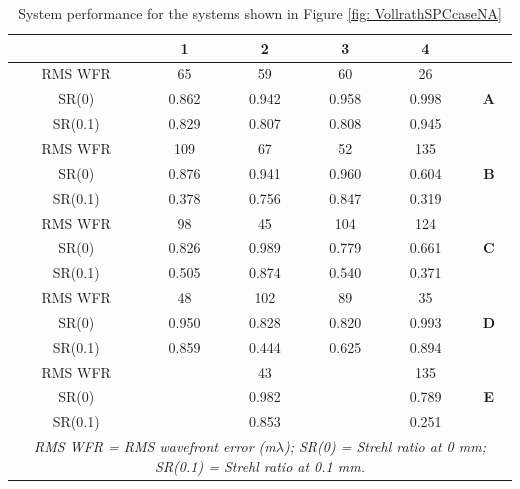 \setlength{\arrayrulewidth}{.5mm}
\setlength{\tabcolsep}{18pt}
\renewcommand{\arraystretch}{1.2}
\begin{table}[h!]
    \centering
    \captionsetup{justification=centering}
    \caption{System performance for the systems shown in Figure \ref{fig: VollrathSPCcaseNA}}
    \label{table: vollratSPCcaseNA}
    \vspace{-1em}
    \begin{adjustbox}{max width=\textwidth, center}
    \begin{tabular}{c c c c c c}
    \hline 
       & \textbf{1} & \textbf{2} & \textbf{3} & \textbf{4} & \\ 
     \midrule
    RMS WFR & 65 & 59 & 60 & 26 & \multirow{3}{*}{\textbf{A}} \\ 
    SR(0) & 0.862 & 0.942 & 0.958 & 0.998\\
    SR(0.1) & 0.829 & 0.807 & 0.808 & 0.945\\
    \midrule
    RMS WFR& 109 & 67 & 52 & 135 & \multirow{3}{*}{\textbf{B}} \\ 
    SR(0) & 0.876 & 0.941 & 0.960 & 0.604\\
    SR(0.1) & 0.378 & 0.756 & 0.847 & 0.319\\
    \midrule
    RMS WFR & 98 & 45 & 104 & 124 & \multirow{3}{*}{\textbf{C}} \\ 
    SR(0) & 0.826 & 0.989 & 0.779 & 0.661\\
    SR(0.1) & 0.505 & 0.874 & 0.540 & 0.371\\
    \midrule
    RMS WFR & 48 & 102 & 89 & 35 & \multirow{3}{*}{\textbf{D}} \\ 
    SR(0) & 0.950 & 0.828 & 0.820 & 0.993\\
    SR(0.1) & 0.859 & 0.444 & 0.625 & 0.894\\
    \midrule
    RMS WFR &  & 43 &  & 135 & \multirow{3}{*}{\textbf{E}} \\ 
    SR(0) &  & 0.982 &  & 0.789\\
    SR(0.1) &  & 0.853 &  & 0.251\\
    \hline
    \multicolumn{6}{c}{\textit{\footnotesize{RMS WFR = RMS wavefront error (m$\lambda$); SR(0) = Strehl ratio at 0 mm; SR(0.1) = Strehl ratio at 0.1 mm.}}}\\
    \end{tabular}
    \end{adjustbox}
\end{table}

